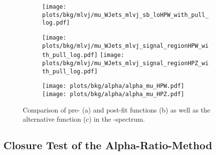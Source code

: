 \begin{figure}
	\centering
	\begin{subfigure}{\textwidth}
		\centering
		\texttt{[image: plots/bkg/mlvj/mu\_WJets\_mlvj\_sb\_loHPW\_with\_pull\_log.pdf]}		
		\caption{}		
	\end{subfigure}
	\begin{subfigure}{\textwidth}
		\texttt{[image: plots/bkg/mlvj/mu\_WJets\_mlvj\_signal\_regionHPW\_with\_pull\_log.pdf]}
		\texttt{[image: plots/bkg/mlvj/mu\_WJets\_mlvj\_signal\_regionHPZ\_with\_pull\_log.pdf]}	
		\caption{}
	\end{subfigure}
	\begin{subfigure}{\textwidth}
		\texttt{[image: plots/bkg/alpha/alpha\_mu\_HPW.pdf]}
		\texttt{[image: plots/bkg/alpha/alpha\_mu\_HPZ.pdf]}
		\caption{}
	\end{subfigure}	
	\caption[Shape of W+jets production in the sideband and signal region as well as alpha-function in the muon channel.]{Comparison of pre- (a) and post-fit functions (b) as well as the alternative function (c) in the \Mpr -spectrum.}
	\label{fig:bkg:mjdata}
\end{figure}



\subsection{Closure Test of the Alpha-Ratio-Method}
